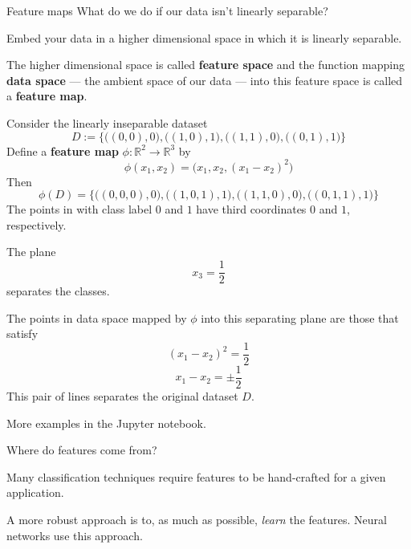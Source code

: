 \documentclass{beamer}
\newcommand{\RR}{\mathbb{R}}
\begin{document}
\begin{frame}{Feature maps}
    What do we do if our data isn't linearly separable?

    Embed your data in a higher dimensional space in which it is linearly separable.

    The higher dimensional space is called \textbf{feature space}
    and the function mapping \textbf{data space} ---
    the ambient space of our data ---
    into this feature space is called a \textbf{feature map}.
    
    
\end{frame}

\begin{frame}
    Consider the linearly inseparable dataset
    \[
        D := \Big\{\big((0, 0), 0\big), \big((1, 0), 1\big),
        \big((1, 1), 0\big), \big((0, 1), 1\big) \Big\}
    \]
    Define a \textbf{feature map} $\phi:\RR^2\to \RR^3$ by
    \[
        \phi(x_1, x_2) = \big(x_1, x_2, (x_1 - x_2)^2\big)
    \]
    Then
    \[
        \phi(D) = \Big\{\big((0, 0, 0), 0\big), \big((1, 0, 1), 1\big),
        \big((1, 1, 0), 0\big), \big((0, 1, 1), 1\big) \Big\}
    \]
    The points in with class label $0$ and $1$ have third coordinates $0$ and $1$, respectively.
\end{frame}

\begin{frame}{}
    The plane $$x_3=\frac12$$ separates the classes.

    The points in data space mapped by $\phi$ into this separating plane are those that satisfy
    \[
        (x_1 - x_2)^2 = \frac12
    \]
    \[
        x_1 - x_2 = \pm \frac12
    \]
    This pair of lines separates the original dataset $D$.

    More examples in the Jupyter notebook.
\end{frame}

\begin{frame}{Where do features come from?}

    Many classification techniques require features to be hand-crafted for
    a given application.

    A more robust approach is to, as much as possible, \emph{learn} the features.
    Neural networks use this approach.
\end{frame}
\end{document}
